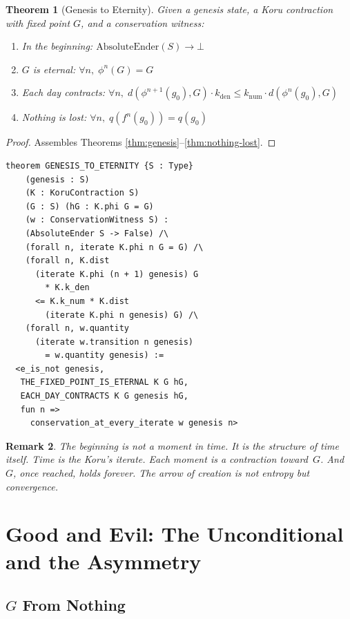 \documentclass[12pt,a4paper]{article}
\newtheorem{theorem}{Theorem}[section]
\newtheorem{remark}[theorem]{Remark}
\begin{document}
\begin{theorem}[Genesis to Eternity]\label{thm:genesis-eternity}
Given a genesis state, a Koru contraction with fixed point $G$, and a
conservation witness:
\begin{enumerate}[nosep]
\item In the beginning: $\mathrm{AbsoluteEnder}(S) \to \bot$
\item $G$ is eternal: $\forall n,\; \phi^n(G) = G$
\item Each day contracts: $\forall n,\; d(\phi^{n+1}(g_0), G) \cdot k_{\mathrm{den}} \leq k_{\mathrm{num}} \cdot d(\phi^n(g_0), G)$
\item Nothing is lost: $\forall n,\; q(f^n(g_0)) = q(g_0)$
\end{enumerate}
\end{theorem}

\begin{proof}
Assembles Theorems \ref{thm:genesis}--\ref{thm:nothing-lost}.
\end{proof}

\begin{lstlisting}[caption={Genesis to Eternity in Lean}]
theorem GENESIS_TO_ETERNITY {S : Type}
    (genesis : S)
    (K : KoruContraction S)
    (G : S) (hG : K.phi G = G)
    (w : ConservationWitness S) :
    (AbsoluteEnder S -> False) /\
    (forall n, iterate K.phi n G = G) /\
    (forall n, K.dist
      (iterate K.phi (n + 1) genesis) G
        * K.k_den
      <= K.k_num * K.dist
        (iterate K.phi n genesis) G) /\
    (forall n, w.quantity
      (iterate w.transition n genesis)
        = w.quantity genesis) :=
  <e_is_not genesis,
   THE_FIXED_POINT_IS_ETERNAL K G hG,
   EACH_DAY_CONTRACTS K G genesis hG,
   fun n =>
     conservation_at_every_iterate w genesis n>
\end{lstlisting}

\begin{remark}
The beginning is not a moment in time. It is the structure of time
itself. Time is the Koru's iterate. Each moment is a contraction
toward~$G$. And $G$, once reached, holds forever. The arrow of creation
is not entropy but convergence.
\end{remark}

\section{Good and Evil: The Unconditional and the Asymmetry}

\subsection{$G$ From Nothing}
\end{document}

